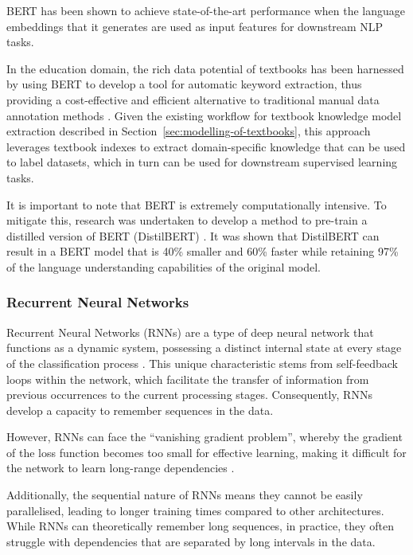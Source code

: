 \documentclass[twocolumn]{article}
\begin{document}
BERT has been shown to achieve state-of-the-art performance when the language embeddings that it generates are used as input features for downstream NLP tasks.

In the education domain, the rich data potential of textbooks has been harnessed by using BERT to develop a tool for automatic keyword extraction, thus providing a cost-effective and efficient alternative to traditional manual data annotation methods \cite{alpizarchacon2023a}. Given the existing workflow for textbook knowledge model extraction described in Section~\ref{sec:modelling-of-textbooks}, this approach leverages textbook indexes to extract domain-specific knowledge that can be used to label datasets, which in turn can be used for downstream supervised learning tasks.

It is important to note that BERT is extremely computationally intensive. To mitigate this, research was undertaken to develop a method to pre-train a distilled version of BERT (DistilBERT) \cite{sanh2020}. It was shown that DistilBERT can result in a BERT model that is 40\% smaller and 60\% faster while retaining 97\% of the language understanding capabilities of the original model.

\subsubsection{Recurrent Neural Networks}

Recurrent Neural Networks (RNNs) are a type of deep neural network that functions as a dynamic system, possessing a distinct internal state at every stage of the classification process \cite{staudemeyer2019}. This unique characteristic stems from self-feedback loops within the network, which facilitate the transfer of information from previous occurrences to the current processing stages. Consequently, RNNs develop a capacity to remember sequences in the data.

However, RNNs can face the ``vanishing gradient problem'', whereby the gradient of the loss function becomes too small for effective learning, making it difficult for the network to learn long-range dependencies \cite{bengio1994}.

Additionally, the sequential nature of RNNs means they cannot be easily parallelised, leading to longer training times compared to other architectures. While RNNs can theoretically remember long sequences, in practice, they often struggle with dependencies that are separated by long intervals in the data.
\end{document}
